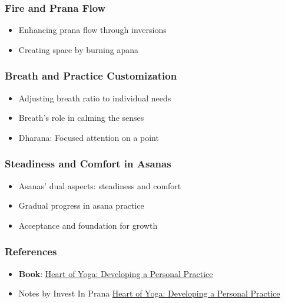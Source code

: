 \begin{frame}[fragile]\frametitle{Fire and Prana Flow}
\begin{itemize}
\item Enhancing prana flow through inversions
\item Creating space by burning apana
\end{itemize}
\end{frame}

\begin{frame}[fragile]\frametitle{Breath and Practice Customization}
\begin{itemize}
\item Adjusting breath ratio to individual needs
\item Breath's role in calming the senses
\item Dharana: Focused attention on a point
\end{itemize}
\end{frame}

\begin{frame}[fragile]\frametitle{Steadiness and Comfort in Asanas}
\begin{itemize}
\item Asanas' dual aspects: steadiness and comfort
\item Gradual progress in asana practice
\item Acceptance and foundation for growth
\end{itemize}
\end{frame}

\begin{frame}[fragile]\frametitle{References}
  \begin{itemize}
    \item \textbf{Book}: \href{https://www.amazon.in/Heart-Yoga-Developing-Personal-Practice/dp/089281764X}{Heart of Yoga: Developing a Personal Practice}
	\item Notes by Invest In Prana \href{https://www.investinprana.com/the-heart-of-yoga-tkv-desikachar}{Heart of Yoga: Developing a Personal Practice}
  \end{itemize}
\end{frame}